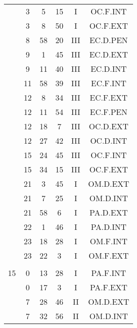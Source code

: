 \documentclass[12pt, a4paper]{article}
\begin{document}
\begin{multicols}{3}
{\begin{tabular}{c c c c c c}
	 	 	 	 & 3 & 5 & 15 & I & OC.F.INT\\%
	 	 	 	 & 3 & 8 & 50 & I & OC.F.EXT\\%
	 	 	 	 & 8 & 58 & 20 & III & EC.D.PEN\\%
	 	 	 	 & 9 & 1 & 45 & III & EC.D.EXT\\%
	 	 	 	 & 9 & 11 & 40 & III & EC.D.INT\\%
	 	 	 	 & 11 & 58 & 39 & III & EC.F.INT\\%
	 	 	 	 & 12 & 8 & 34 & III & EC.F.EXT\\%
	 	 	 	 & 12 & 11 & 54 & III & EC.F.PEN\\%
	 	 	 	 & 12 & 18 & 7 & III & OC.D.EXT\\%
	 	 	 	 & 12 & 27 & 42 & III & OC.D.INT\\%
	 	 	 	 & 15 & 24 & 45 & III & OC.F.INT\\%
	 	 	 	 & 15 & 34 & 15 & III & OC.F.EXT\\%
	 	 	 	 & 21 & 3 & 45 & I & OM.D.EXT\\%
	 	 	 	 & 21 & 7 & 25 & I & OM.D.INT\\%
	 	 	 	 & 21 & 58 & 6 & I & PA.D.EXT\\%
	 	 	 	 & 22 & 1 & 46 & I & PA.D.INT\\%
	 	 	 	 & 23 & 18 & 28 & I & OM.F.INT\\%
	 	 	 	 & 23 & 22 & 3 & I & OM.F.EXT\\%
	 	 	 	 & & & & & \\%
	 	 	 	15 & 0 & 13 & 28 & I & PA.F.INT\\%
	 	 	 	 & 0 & 17 & 3 & I & PA.F.EXT\\%
	 	 	 	 & 7 & 28 & 46 & II & OM.D.EXT\\%
	 	 	 	 & 7 & 32 & 56 & II & OM.D.INT\\%

\end{tabular}}
\end{multicols}
\end{document}
